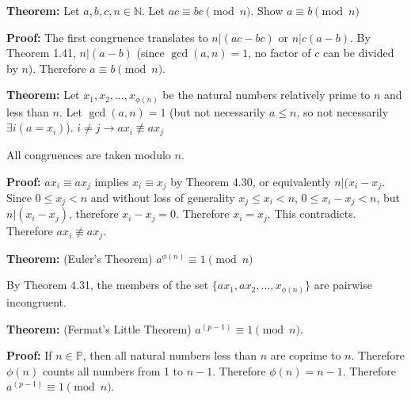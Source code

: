 \item \textbf{Theorem:} Let \(a, b, c, n \in \mathbb N\). Let \(ac \equiv bc \pmod n\). Show \(a \equiv b \pmod n\)

\textbf{Proof:} The first congruence translates to \(n | (ac-bc)\) or \(n | c(a-b)\). By Theorem 1.41, \(n | (a-b)\) (since \(\gcd(a, n) = 1\), no factor of \(c\) can be divided by \(n\)). Therefore \(a \equiv b \pmod n\). \qedhere

\item \textbf{Theorem:} Let \(x_1, x_2, \dots, x_{\phi(n)}\) be the natural numbers relatively prime to \(n\) and less than \(n\). Let \(\gcd(a, n) = 1\) (but not necessarily \(a \leq n\), so not necessarily \(\exists i (a = x_i)\)). \(i \neq j \rightarrow ax_i \not\equiv ax_j\)

All congruences are taken modulo \(n\).

\textbf{Proof:} \(ax_i \equiv ax_j\) implies \(x_i \equiv x_j\) by Theorem 4.30, or equivalently \(n|(x_i - x_j\). Since \(0 \leq x_j < n\) and without loss of generality \(x_j \leq x_i < n\), \(0 \leq x_i - x_j < n\), but \(n|(x_i - x_j)\), therefore \(x_i - x_j = 0\). Therefore \(x_i = x_j\). This contradicts. Therefore \(ax_i \not\equiv ax_j\). \qedhere

\item \textbf{Theorem:} (Euler's Theorem) \(a^{\phi(n)} \equiv 1 \pmod n\)

By Theorem 4.31, the members of the set \(\{ax_1, ax_2, \dots, x_{\phi(n)}\}\) are pairwise incongruent.

\item \textbf{Theorem:} (Fermat's Little Theorem) \(a^{(p-1)} \equiv 1 \pmod n\).

\textbf{Proof:} If \(n \in \mathbb P\), then all natural numbers less than \(n\) are coprime to \(n\). Therefore \(\phi(n)\) counts all numbers from 1 to \(n-1\). Therefore \(\phi(n) = n - 1\). Therefore \(a^{(p-1)} \equiv 1 \pmod n\). \qedhere


